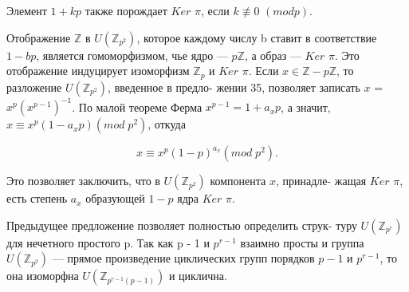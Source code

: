 \documentclass{../template/mai_book}
\begin{document}
\begin{mynotice} Элемент $1+kp$ также порождает $Ker$ $\pi$, если $k \not\equiv 0$ \linebreak $(mod p)$. \par

Отображение $\mathbb{Z}$ в $U({{\mathbb{Z}}_{p^{2}}})$, которое каждому числу b ставит в \linebreak соответствие $1-bp$, является гомоморфизмом, чье ядро --- $p \mathbb{Z}$, а \linebreak образ --- $Ker$ $\pi$. 
Это отображение индуцирует изоморфизм $\mathbb{Z}_{p}$ и \linebreak $Ker$ $\pi$. Если $x\in\mathbb{Z} - p\mathbb{Z}$, то разложение $U(\mathbb{Z}_{p^{2}})$, введенное в предло- \linebreak жении 35, позволяет записать $x$ = $x^{p}(x^{p-1})^{-1}$. По малой теореме \linebreak Ферма $x^{p-1}=1+a_{x}p$, а значит, $x\equiv x^{p}(1-a_{x}p) (mod \; p^{2})$, откуда \par  
\vspace{\baselineskip}
$$ x\equiv x^{p}(1-p)^{a_{x}} (mod \; p^2). $$ \par
\vspace{\baselineskip}
\noindent Это позволяет заключить, что в $U(\mathbb{Z}_{p^{2}})$ компонента $x$, принадле- \linebreak жащая $Ker$ $\pi$, есть степень $a_{x}$ образующей $1-p$ ядра $Ker$ $\pi$. \par
\vspace{\baselineskip}
\end{mynotice}
Предыдущее предложение позволяет полностью определить струк- \linebreak туру $U(\mathbb{Z}_{p^{r}})$ для нечетного простого p. Так как p - 1 и $p^{r-1}$ взаимно \linebreak просты и группа $U(\mathbb{Z}_{p^{2}})$ --- прямое произведение циклических групп \linebreak порядков $p-1$ и $p^{r-1}$, то она изоморфна $U(\mathbb{Z}_{p^{r-1}(p-1)})$ и циклична. \par
 
\end{document}
